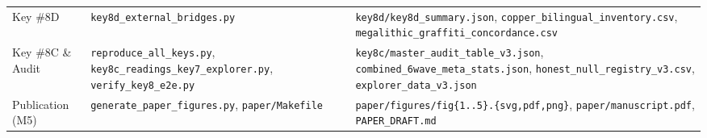 \documentclass[11pt,a4paper]{article}
\begin{document}
\begin{table}[htbp]
\begin{tabularx}{\textwidth}{@{}L{2.2cm}L{5.1cm}Y@{}}
Key \#8D & \texttt{key8d\_external\_bridges.py} & \texttt{key8d/key8d\_summary.json}, \texttt{copper\_bilingual\_inventory.csv}, \texttt{megalithic\_graffiti\_concordance.csv} \\
Key \#8C \& Audit & \texttt{reproduce\_all\_keys.py}, \texttt{key8c\_readings\_key7\_explorer.py}, \texttt{verify\_key8\_e2e.py} & \texttt{key8c/master\_audit\_table\_v3.json}, \texttt{combined\_6wave\_meta\_stats.json}, \texttt{honest\_null\_registry\_v3.csv}, \texttt{explorer\_data\_v3.json} \\
Publication (M5) & \texttt{generate\_paper\_figures.py}, \texttt{paper/Makefile} & \texttt{paper/figures/fig\{1..5\}.\{svg,pdf,png\}}, \texttt{paper/manuscript.pdf}, \texttt{PAPER\_DRAFT.md} \\
\bottomrule
\end{tabularx}
\end{table}



\end{document}
